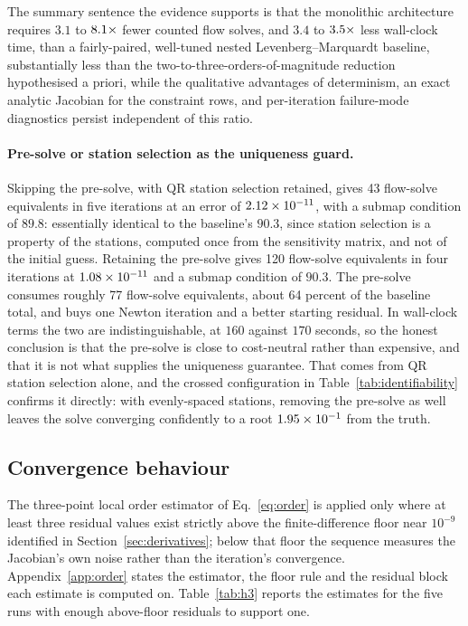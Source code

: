 The summary sentence the evidence supports is that the monolithic
architecture requires $3.1$ to $8.1\times$ fewer counted flow solves, and
$3.4$ to $3.5\times$ less wall-clock time, than a fairly-paired, well-tuned nested
Levenberg--Marquardt baseline, substantially less than the
two-to-three-orders-of-magnitude reduction hypothesised a priori, while the qualitative
advantages of determinism, an exact analytic Jacobian for the constraint rows,
and per-iteration failure-mode diagnostics persist independent of this ratio.

\paragraph{Pre-solve or station selection as the uniqueness guard.} Skipping
the pre-solve, with QR station selection retained, gives 43 flow-solve
equivalents in five iterations at an error of $2.12\times10^{-11}$, with a submap
condition of $89.8$: essentially identical to the baseline's $90.3$, since
station selection is a property of the stations, computed once from the
sensitivity matrix, and not of the initial guess. Retaining the pre-solve
gives 120 flow-solve equivalents in four iterations at $1.08\times10^{-11}$ and a
submap condition of $90.3$. The pre-solve consumes roughly 77 flow-solve
equivalents, about 64 percent of the baseline total, and buys one Newton
iteration and a better starting residual. In wall-clock terms the two are
indistinguishable, at $160$ against $170$ seconds, so the honest conclusion is
that the pre-solve is close to cost-neutral rather than expensive, and that it
is not what supplies the uniqueness guarantee. That comes from QR station
selection alone, and the crossed configuration in
Table~\ref{tab:identifiability} confirms it directly: with evenly-spaced
stations, removing the pre-solve as well leaves the solve converging
confidently to a root $1.95\times10^{-1}$ from the truth.

\subsection{Convergence behaviour}
\label{sec:h3}

The three-point local order estimator of Eq.~\eqref{eq:order} is applied only
where at least three residual values exist strictly above the
finite-difference floor near $10^{-9}$ identified in
Section~\ref{sec:derivatives}; below that floor the sequence measures the
Jacobian's own noise rather than the iteration's convergence.
Appendix~\ref{app:order} states the estimator, the floor rule and the residual
block each estimate is computed on.
Table~\ref{tab:h3} reports the estimates for the five runs with enough
above-floor residuals to support one.

